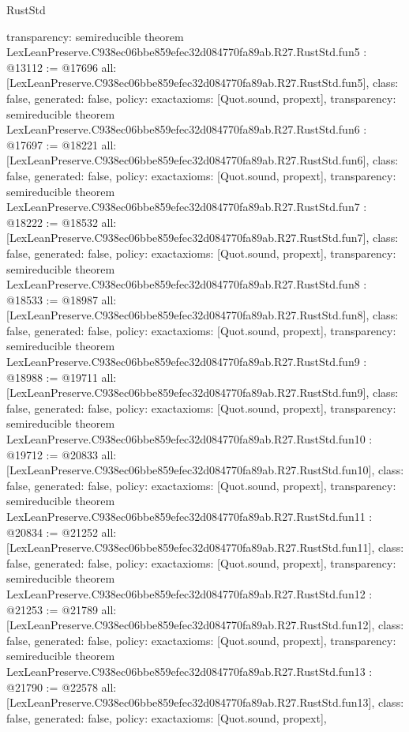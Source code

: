 \begin{lexlean}{RustStd}
\begin{coremodule}
{  transparency: semireducible
}
theorem LexLeanPreserve.C938ec06bbe859efec32d084770fa89ab.R27.RustStd.fun5 : @13112 := @17696 {
  all: [LexLeanPreserve.C938ec06bbe859efec32d084770fa89ab.R27.RustStd.fun5],
  class: false,
  generated: false,
  policy: exact{axioms: [Quot.sound, propext]},
  transparency: semireducible
}
theorem LexLeanPreserve.C938ec06bbe859efec32d084770fa89ab.R27.RustStd.fun6 : @17697 := @18221 {
  all: [LexLeanPreserve.C938ec06bbe859efec32d084770fa89ab.R27.RustStd.fun6],
  class: false,
  generated: false,
  policy: exact{axioms: [Quot.sound, propext]},
  transparency: semireducible
}
theorem LexLeanPreserve.C938ec06bbe859efec32d084770fa89ab.R27.RustStd.fun7 : @18222 := @18532 {
  all: [LexLeanPreserve.C938ec06bbe859efec32d084770fa89ab.R27.RustStd.fun7],
  class: false,
  generated: false,
  policy: exact{axioms: [Quot.sound, propext]},
  transparency: semireducible
}
theorem LexLeanPreserve.C938ec06bbe859efec32d084770fa89ab.R27.RustStd.fun8 : @18533 := @18987 {
  all: [LexLeanPreserve.C938ec06bbe859efec32d084770fa89ab.R27.RustStd.fun8],
  class: false,
  generated: false,
  policy: exact{axioms: [Quot.sound, propext]},
  transparency: semireducible
}
theorem LexLeanPreserve.C938ec06bbe859efec32d084770fa89ab.R27.RustStd.fun9 : @18988 := @19711 {
  all: [LexLeanPreserve.C938ec06bbe859efec32d084770fa89ab.R27.RustStd.fun9],
  class: false,
  generated: false,
  policy: exact{axioms: [Quot.sound, propext]},
  transparency: semireducible
}
theorem LexLeanPreserve.C938ec06bbe859efec32d084770fa89ab.R27.RustStd.fun10 : @19712 := @20833 {
  all: [LexLeanPreserve.C938ec06bbe859efec32d084770fa89ab.R27.RustStd.fun10],
  class: false,
  generated: false,
  policy: exact{axioms: [Quot.sound, propext]},
  transparency: semireducible
}
theorem LexLeanPreserve.C938ec06bbe859efec32d084770fa89ab.R27.RustStd.fun11 : @20834 := @21252 {
  all: [LexLeanPreserve.C938ec06bbe859efec32d084770fa89ab.R27.RustStd.fun11],
  class: false,
  generated: false,
  policy: exact{axioms: [Quot.sound, propext]},
  transparency: semireducible
}
theorem LexLeanPreserve.C938ec06bbe859efec32d084770fa89ab.R27.RustStd.fun12 : @21253 := @21789 {
  all: [LexLeanPreserve.C938ec06bbe859efec32d084770fa89ab.R27.RustStd.fun12],
  class: false,
  generated: false,
  policy: exact{axioms: [Quot.sound, propext]},
  transparency: semireducible
}
theorem LexLeanPreserve.C938ec06bbe859efec32d084770fa89ab.R27.RustStd.fun13 : @21790 := @22578 {
  all: [LexLeanPreserve.C938ec06bbe859efec32d084770fa89ab.R27.RustStd.fun13],
  class: false,
  generated: false,
  policy: exact{axioms: [Quot.sound, propext]},
}
\end{coremodule}
\end{lexlean}
